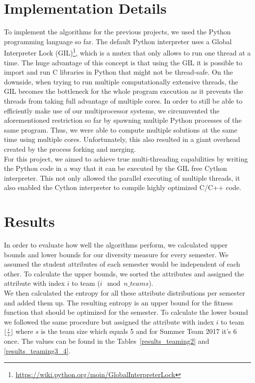 \documentclass[12pt,a4paper]{article}
\begin{document}
\section{Implementation Details}
\label{sec:implementation}
To implement the algorithms for the previous projects, we used the Python programming language so far.
The default Python interpreter uses a Global Interpreter Lock (GIL)\footnote{\url{https://wiki.python.org/moin/GlobalInterpreterLock}}, which is a mutex that only allows to run one thread at a time.
The huge advantage of this concept is that using the GIL it is possible to import and run C libraries in Python that might not be thread-safe.
On the downside, when trying to run multiple computationally extensive threads, the GIL becomes the bottleneck for the whole program execution as it prevents the threads from taking full advantage of multiple cores.
In order to still be able to efficiently make use of our multiprocessor systems, we circumvented the aforementioned restriction so far by spawning multiple Python processes of the same program.
Thus, we were able to compute multiple solutions at the same time using multiple cores.
Unfortunately, this also resulted in a giant overhead created by the process forking and merging.\\
For this project, we aimed to achieve true multi-threading capabilities by writing the Python code in a way that it can be executed by the GIL free Cython interpreter.
This not only allowed the parallel executing of multiple threads, it also enabled the Cython interpreter to compile highly optimized C/C++ code.


\section{Results}
\label{sec:results}
In order to evaluate how well the algorithms perform, we calculated upper bounds and lower bounds for our diversity measure for every semester.
We assumed the student attributes of each semester would be independent of each other.
To calculate the upper bounds, we sorted the attributes and assigned the attribute with index $i$ to team ($i \mod n\_teams$). \\
We then calculated the entropy for all these attribute distributions per semester and added them up.
The resulting entropy is an upper bound for the fitness function that should be optimized for the semester. To calculate the lower bound we followed the same procedure but assigned the attribute with index $i$ to team $\lfloor \frac{i}{s} \rfloor$ where $s$ is the team size which equals 5 and for Summer Team 2017 it's 6 once. The values can be found in the Tables~\ref{results_teaming2} and \ref{results_teaming3_4}.
\end{document}
